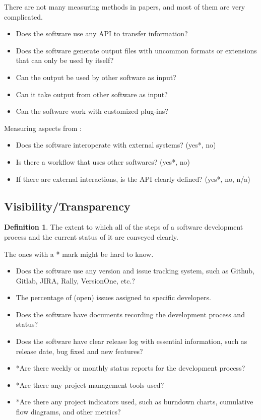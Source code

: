 \documentclass{article}
\theoremstyle{definition}
\newtheorem{defn}{Definition}
\begin{document}
There are not many measuring methods in papers, and most of them are very
complicated.
\begin{itemize}
\item Does the software use any API to transfer information?
\item Does the software generate output files with uncommon formats or
extensions that can only be used by itself?
\item Can the output be used by other software as input?
\item Can it take output from other software as input?
\item Can the software work with customized plug-ins? 
\end{itemize}

\noindent Measuring aspects from \citep{SmithEtAl2018}:
\begin{itemize}
\item Does the software interoperate with external systems? ({yes*, no})
\item Is there a workflow that uses other softwares? ({yes*, no})
\item If there are external interactions, is the API clearly defined? ({yes*,
no, n/a})
\end{itemize}

\subsection{Visibility/Transparency}
\begin{defn}
The extent to which all of the steps of a software development process and the
current status of it are conveyed clearly.
\end{defn}
The ones with a * mark might be hard to know.
\begin{itemize}
\item Does the software use any version and issue tracking system, such as
Github, Gitlab, JIRA, Rally, VersionOne, etc.?
\item The percentage of (open) issues assigned to specific developers.
\item Does the software have documents recording the development process and
status?
\item Does the software have clear release log with essential information, such
as release date, bug fixed and new features?
\item *Are there weekly or monthly status reports for the development process?
\item *Are there any project management tools used?
\item *Are there any project indicators used, such as burndown charts,
cumulative flow diagrams, and other metrics?
\end{itemize}
\end{document}
